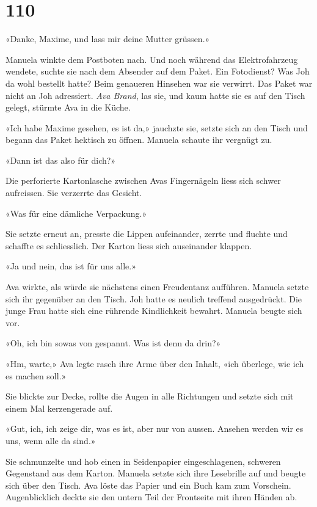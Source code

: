 \chapter{110}



«Danke, Maxime, und lass mir deine Mutter grüssen.»

Manuela winkte dem Postboten nach. Und noch während das Elektrofahrzeug
wendete, suchte sie nach dem Absender auf dem Paket. Ein Fotodienst? Was
Joh da wohl bestellt hatte? Beim genaueren Hinsehen war sie verwirrt. Das
Paket war nicht an Joh adressiert. \emph{Ava Brand}, las sie, und kaum
hatte sie es auf den Tisch gelegt, stürmte Ava in die Küche.

«Ich habe Maxime gesehen, es ist da,» jauchzte sie, setzte sich an den
Tisch und begann das Paket hektisch zu öffnen. Manuela schaute ihr
vergnügt zu.

«Dann ist das also für dich?»

Die perforierte Kartonlasche zwischen Avas Fingernägeln liess sich
schwer aufreissen. Sie verzerrte das Gesicht.

«Was für eine dämliche Verpackung.»

Sie setzte erneut an, presste die Lippen aufeinander, zerrte und fluchte
und schaffte es schliesslich. Der Karton liess sich auseinander klappen.

«Ja und nein, das ist für uns alle.»

Ava wirkte, als würde sie nächstens einen Freudentanz aufführen.
Manuela setzte sich ihr gegenüber an den Tisch. Joh hatte es neulich treffend
ausgedrückt. Die junge Frau hatte sich eine rührende Kindlichkeit bewahrt.
Manuela beugte sich vor.

«Oh, ich bin sowas von gespannt. Was ist denn da drin?»

«Hm, warte,» Ava legte rasch ihre Arme über den Inhalt, «ich überlege,
wie ich es machen soll.»

Sie blickte zur Decke, rollte die Augen in alle Richtungen und setzte
sich mit einem Mal kerzengerade auf.

«Gut, ich, ich zeige dir, was es ist, aber nur von aussen. Ansehen
werden wir es uns, wenn alle da sind.»

Sie schmunzelte und hob einen in Seidenpapier eingeschlagenen, schweren Gegenstand aus dem Karton.
Manuela  setzte sich ihre Lesebrille auf und beugte sich über den Tisch.  
Ava löste das Papier und ein Buch kam zum Vorschein. Augenblicklich deckte sie den untern Teil der Frontseite mit ihren Händen ab. 
 
